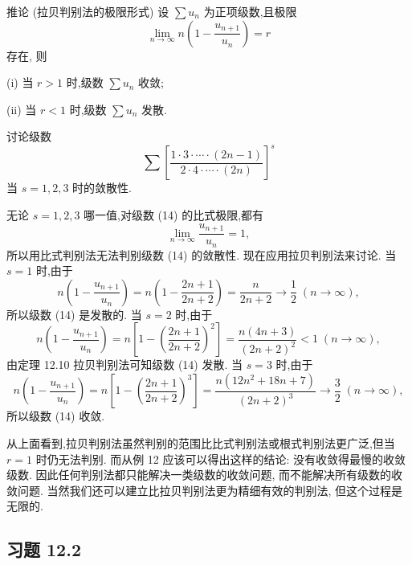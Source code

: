 推论 (拉贝判别法的极限形式) 设 \(\sum {u}_{n}\) 为正项级数,且极限
\[
\mathop{\lim }\limits_{{n \rightarrow  \infty }}n\left( {1 - \frac{{u}_{n + 1}}{{u}_{n}}}\right)  = r
\]
存在, 则

(i) 当 \(r > 1\) 时,级数 \(\sum {u}_{n}\) 收敛;

(ii) 当 \(r < 1\) 时,级数 \(\sum {u}_{n}\) 发散.

\begin{example}

\end{example}
讨论级数
\[
\sum {\left\lbrack  \frac{1 \cdot  3 \cdot  \cdots  \cdot  \left( {{2n} - 1}\right) }{2 \cdot  4 \cdot  \cdots  \cdot  \left( {2n}\right) }\right\rbrack  }^{s} \tag{14}
\]
当 \(s = 1,2,3\) 时的敛散性.

\begin{solution}

\end{solution}
无论 \(s = 1,2,3\) 哪一值,对级数 (14) 的比式极限,都有
\[
\mathop{\lim }\limits_{{n \rightarrow  \infty }}\frac{{u}_{n + 1}}{{u}_{n}} = 1,
\]
所以用比式判别法无法判别级数 (14) 的敛散性. 现在应用拉贝判别法来讨论. 当 \(s = 1\) 时,由于
\[
n\left( {1 - \frac{{u}_{n + 1}}{{u}_{n}}}\right)  = n\left( {1 - \frac{{2n} + 1}{{2n} + 2}}\right)  = \frac{n}{{2n} + 2} \rightarrow  \frac{1}{2}\;\left( {n \rightarrow  \infty }\right) ,
\]
所以级数 (14) 是发散的. 当 \(s = 2\) 时,由于
\[
n\left( {1 - \frac{{u}_{n + 1}}{{u}_{n}}}\right)  = n\left\lbrack  {1 - {\left( \frac{{2n} + 1}{{2n} + 2}\right) }^{2}}\right\rbrack   = \frac{n\left( {{4n} + 3}\right) }{{\left( 2n + 2\right) }^{2}} < 1\;\left( {n \rightarrow  \infty }\right) ,
\]
由定理 12.10 拉贝判别法可知级数 (14) 发散. 当 \(s = 3\) 时,由于
\[
n\left( {1 - \frac{{u}_{n + 1}}{{u}_{n}}}\right)  = n\left\lbrack  {1 - {\left( \frac{{2n} + 1}{{2n} + 2}\right) }^{3}}\right\rbrack   = \frac{n\left( {{12}{n}^{2} + {18n} + 7}\right) }{{\left( 2n + 2\right) }^{3}} \rightarrow  \frac{3}{2}\;\left( {n \rightarrow  \infty }\right) ,
\]
所以级数 (14) 收敛.

从上面看到,拉贝判别法虽然判别的范围比比式判别法或根式判别法更广泛,但当 \(r = 1\) 时仍无法判别. 而从例 12 应该可以得出这样的结论: 没有收敛得最慢的收敛级数. 因此任何判别法都只能解决一类级数的收敛问题, 而不能解决所有级数的收敛问题. 当然我们还可以建立比拉贝判别法更为精细有效的判别法, 但这个过程是无限的.

\subsection{习题 12.2}

